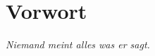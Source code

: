 %
%
\chapter*{Vorwort}
\thispagestyle{empty}

\begin{displayquote}
\textit{Niemand meint alles was er sagt.}
\end{displayquote}

\lipsum[1-3]
